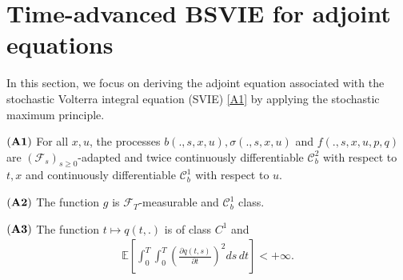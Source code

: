 \documentclass[12pt]{article}
\theoremstyle{remark}
\numberwithin{equation}{section}
\def\E{\mathbb E}
\def\E{\mathbb E}
\begin{document}
\section{Time-advanced BSVIE for adjoint equations }\label{sec:adjoint}

In this section, we focus on deriving the adjoint equation associated with the stochastic Volterra integral equation (SVIE) \eqref{A1} by applying the stochastic maximum principle.
\begin{description}
\item $({\bf A1})$ For all $x,u$, the processes $b(.,s,x,u), \sigma(.,s,x,u)$ and $f(.,s,x,u,p,q)$ are $(\mathcal{F}_{s})_{s\geq 0}$-adapted and twice continuously differentiable $\mathcal{C}^2_{b}$ with respect to $t, x$ and continuously differentiable $\mathcal{C}^1_{b}$ with respect to $u$.
\item $({\bf A2})$ The function $g$ is $\mathcal{F}_{T}$-measurable and   $\mathcal{C}^1_{b}$ class. 
\item $ ({\bf A3})$ The function $t \mapsto q(t,.)$ is of class $C^1$ and
\begin{eqnarray*}
	\E\left[
\int_0^T \int_0^T 
\left(\frac{\partial q(t,s)}{\partial t}\right)^2 ds\,dt
\right] < +\infty.
\end{eqnarray*}
\end{description}
\end{document}
